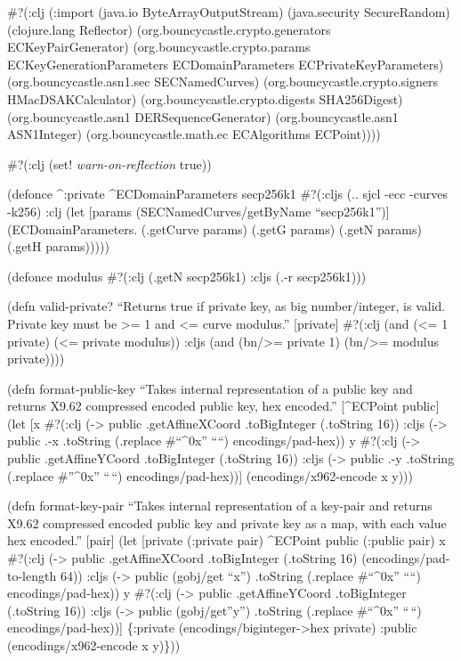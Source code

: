 \documentclass[
]{article}
\begin{document}
\#?(:clj (:import (java.io ByteArrayOutputStream) (java.security
SecureRandom) (clojure.lang Reflector)
(org.bouncycastle.crypto.generators ECKeyPairGenerator)
(org.bouncycastle.crypto.params ECKeyGenerationParameters
ECDomainParameters ECPrivateKeyParameters) (org.bouncycastle.asn1.sec
SECNamedCurves) (org.bouncycastle.crypto.signers HMacDSAKCalculator)
(org.bouncycastle.crypto.digests SHA256Digest) (org.bouncycastle.asn1
DERSequenceGenerator) (org.bouncycastle.asn1 ASN1Integer)
(org.bouncycastle.math.ec ECAlgorithms ECPoint))))

\#?(:clj (set! \emph{warn-on-reflection} true))

(defonce \^{}:private \^{}ECDomainParameters secp256k1 \#?(:cljs (..
sjcl -ecc -curves -k256) :clj (let {[}params (SECNamedCurves/getByName
``secp256k1''){]} (ECDomainParameters. (.getCurve params) (.getG params)
(.getN params) (.getH params)))))

(defonce modulus \#?(:clj (.getN secp256k1) :cljs (.-r secp256k1)))

(defn valid-private? ``Returns true if private key, as big
number/integer, is valid. Private key must be \textgreater= 1 and
\textless= curve modulus.'' {[}private{]} \#?(:clj (and (\textless= 1
private) (\textless= private modulus)) :cljs (and (bn/\textgreater=
private 1) (bn/\textgreater= modulus private))))

(defn format-public-key ``Takes internal representation of a public key
and returns X9.62 compressed encoded public key, hex encoded.''
{[}\^{}ECPoint public{]} (let {[}x \#?(:clj (-\textgreater{} public
.getAffineXCoord .toBigInteger (.toString 16)) :cljs (-\textgreater{}
public .-x .toString (.replace \#``\^{}0x'' ````) encodings/pad-hex)) y
\#?(:clj (-\textgreater{} public .getAffineYCoord .toBigInteger
(.toString 16)) :cljs (-\textgreater{} public .-y .toString (.replace
\#''\^{}0x'' ``\,``) encodings/pad-hex)){]} (encodings/x962-encode x
y)))

(defn format-key-pair ``Takes internal representation of a key-pair and
returns X9.62 compressed encoded public key and private key as a map,
with each value hex encoded.'' {[}pair{]} (let {[}private (:private
pair) \^{}ECPoint public (:public pair) x \#?(:clj (-\textgreater{}
public .getAffineXCoord .toBigInteger (.toString 16)
(encodings/pad-to-length 64)) :cljs (-\textgreater{} public (gobj/get
``x'') .toString (.replace \#``\^{}0x'' ````) encodings/pad-hex)) y
\#?(:clj (-\textgreater{} public .getAffineYCoord .toBigInteger
(.toString 16)) :cljs (-\textgreater{} public (gobj/get''y'') .toString
(.replace \#``\^{}0x'' ``\,``) encodings/pad-hex)){]} \{:private
(encodings/biginteger-\textgreater hex private) :public
(encodings/x962-encode x y)\}))
\end{document}
